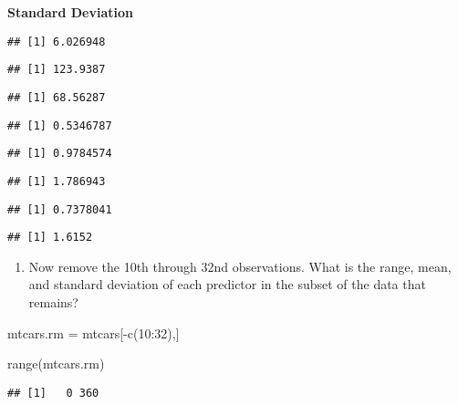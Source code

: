\documentclass[
]{article}
\newenvironment{Shaded}{\begin{snugshade}}{\end{snugshade}}
\newcommand{\DecValTok}[1]{\textcolor[rgb]{0.00,0.00,0.81}{#1}}
\newcommand{\FunctionTok}[1]{\textcolor[rgb]{0.00,0.00,0.00}{#1}}
\newcommand{\NormalTok}[1]{#1}
\newcommand{\OtherTok}[1]{\textcolor[rgb]{0.56,0.35,0.01}{#1}}
\newcommand{\SpecialCharTok}[1]{\textcolor[rgb]{0.00,0.00,0.00}{#1}}
\providecommand{\tightlist}{%
  \setlength{\itemsep}{0pt}\setlength{\parskip}{0pt}}
\begin{document}
\textbf{Standard Deviation}

\begin{verbatim}
## [1] 6.026948
\end{verbatim}

\begin{verbatim}
## [1] 123.9387
\end{verbatim}

\begin{verbatim}
## [1] 68.56287
\end{verbatim}

\begin{verbatim}
## [1] 0.5346787
\end{verbatim}

\begin{verbatim}
## [1] 0.9784574
\end{verbatim}

\begin{verbatim}
## [1] 1.786943
\end{verbatim}

\begin{verbatim}
## [1] 0.7378041
\end{verbatim}

\begin{verbatim}
## [1] 1.6152
\end{verbatim}

\begin{enumerate}
\def\labelenumi{(\alph{enumi})}
\setcounter{enumi}{3}
\tightlist
\item
  Now remove the 10th through 32nd observations. What is the range,
  mean, and standard deviation of each predictor in the subset of the
  data that remains?
\end{enumerate}

\begin{Shaded}
\begin{Highlighting}[]
\NormalTok{mtcars.rm }\OtherTok{=}\NormalTok{ mtcars[}\SpecialCharTok{{-}}\FunctionTok{c}\NormalTok{(}\DecValTok{10}\SpecialCharTok{:}\DecValTok{32}\NormalTok{),]}
\end{Highlighting}
\end{Shaded}

\begin{Shaded}
\begin{Highlighting}[]
\FunctionTok{range}\NormalTok{(mtcars.rm)}
\end{Highlighting}
\end{Shaded}

\begin{verbatim}
## [1]   0 360
\end{verbatim}
\end{document}
